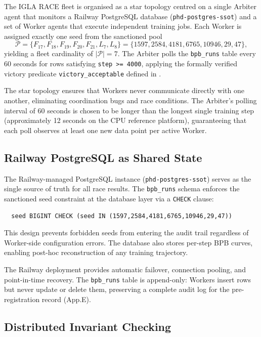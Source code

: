 The IGLA RACE fleet is organised as a star topology centred on a single Arbiter agent that monitors a Railway PostgreSQL database (\texttt{phd-postgres-ssot}) and a set of Worker agents that execute independent training jobs. Each Worker is assigned exactly one seed from the sanctioned pool
\[
\mathcal{P} = \{F_{17}, F_{18}, F_{19}, F_{20}, F_{21}, L_7, L_8\} = \{1597, 2584, 4181, 6765, 10946, 29, 47\},
\]
yielding a fleet cardinality of \(|\mathcal{P}| = 7\). The Arbiter polls the \texttt{bpb\_runs} table every 60 seconds for rows satisfying \texttt{step >= 4000}, applying the formally verified victory predicate \texttt{victory\_acceptable} defined in .

The star topology ensures that Workers never communicate directly with one another, eliminating coordination bugs and race conditions. The Arbiter's polling interval of 60 seconds is chosen to be longer than the longest single training step (approximately 12 seconds on the CPU reference platform), guaranteeing that each poll observes at least one new data point per active Worker.

\subsection{Railway PostgreSQL as Shared State}\label{fa_21:subsec:railway-ssot}

The Railway-managed PostgreSQL instance (\texttt{phd-postgres-ssot}) serves as the single source of truth for all race results. The \texttt{bpb\_runs} schema enforces the sanctioned seed constraint at the database layer via a \texttt{CHECK} clause:
\begin{verbatim}
  seed BIGINT CHECK (seed IN (1597,2584,4181,6765,10946,29,47))
\end{verbatim}
This design prevents forbidden seeds from entering the audit trail regardless of Worker-side configuration errors. The database also stores per-step BPB curves, enabling post-hoc reconstruction of any training trajectory.

The Railway deployment provides automatic failover, connection pooling, and point-in-time recovery. The \texttt{bpb\_runs} table is append-only: Workers insert rows but never update or delete them, preserving a complete audit log for the pre-registration record (App.E).

\subsection{Distributed Invariant Checking}\label{fa_21:subsec:dist-invariant}


